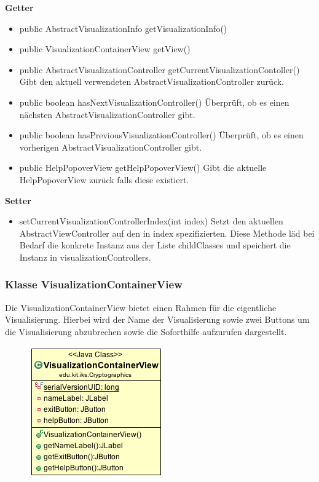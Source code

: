 \documentclass{article}
\begin{document}
      \textbf{Getter}
      \begin{itemize}
        \item public AbstractVisualizationInfo getVisualizationInfo()
        \item public VisualizationContainerView getView()
        \item public AbstractVisualizationController getCurrentVisualizationContoller() \newline
        Gibt den aktuell verwendeten AbstractVisualizationController zurück.
        \item public boolean hasNextVisualizationController() \newline
        Überprüft, ob es einen nächsten AbstractVisualizationController gibt.
        \item public boolean hasPreviousVisualizationController() \newline
        Überprüft, ob es einen vorherigen AbstractVisualizationController gibt.
        \item public HelpPopoverView getHelpPopoverView() \newline
        Gibt die aktuelle HelpPopoverView zurück falls diese existiert.
      \end{itemize}

      \textbf{Setter}
      \begin{itemize}
        \item setCurrentVisualizationControllerIndex(int index) \newline
        Setzt den aktuellen AbstractViewController auf den in index spezifizierten. Diese Methode läd bei Bedarf 
        die konkrete Instanz aus der Liste childClasses und speichert die Instanz in visualizationControllers.
      \end{itemize}

    \subsubsection{Klasse VisualizationContainerView}
      Die VisualizationContainerView bietet einen Rahmen für die eigentliche Visualisierung. Hierbei wird der Name der Visualisierung sowie zwei Buttons um die Visualisierung abzubrechen sowie die Soforthilfe aufzurufen dargestellt.
      \begin{figure}[H]
        \centering
        \includegraphics{resources/edu-kit-iks-Cryptographics-VisualizationContainerView}
      \end{figure}
\end{document}

